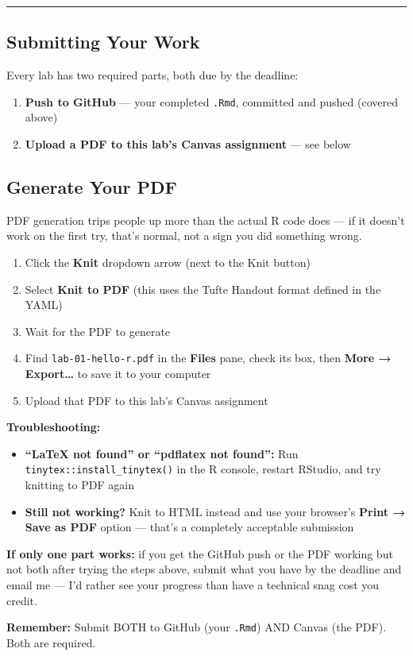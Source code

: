 \documentclass[]{tufte-handout}
\providecommand{\tightlist}{%
  \setlength{\itemsep}{0pt}\setlength{\parskip}{0pt}}
\begin{document}
\begin{center}\rule{0.5\linewidth}{0.5pt}\end{center}

\subsection{Submitting Your Work}\label{submitting-your-work}

Every lab has two required parts, both due by the deadline:

\begin{enumerate}
\def\labelenumi{\arabic{enumi}.}
\tightlist
\item
  \textbf{Push to GitHub} --- your completed \texttt{.Rmd}, committed
  and pushed (covered above)
\item
  \textbf{Upload a PDF to this lab's Canvas assignment} --- see below
\end{enumerate}

\subsection{Generate Your PDF}\label{generate-your-pdf}

PDF generation trips people up more than the actual R code does --- if
it doesn't work on the first try, that's normal, not a sign you did
something wrong.

\begin{enumerate}
\def\labelenumi{\arabic{enumi}.}
\tightlist
\item
  Click the \textbf{Knit} dropdown arrow (next to the Knit button)
\item
  Select \textbf{Knit to PDF} (this uses the Tufte Handout format
  defined in the YAML)
\item
  Wait for the PDF to generate
\item
  Find \texttt{lab-01-hello-r.pdf} in the \textbf{Files} pane, check its
  box, then \textbf{More → Export\ldots{}} to save it to your computer
\item
  Upload that PDF to this lab's Canvas assignment
\end{enumerate}

\textbf{Troubleshooting:}

\begin{itemize}
\tightlist
\item
  \textbf{``LaTeX not found'' or ``pdflatex not found'':} Run
  \texttt{tinytex::install\_tinytex()} in the R console, restart
  RStudio, and try knitting to PDF again
\item
  \textbf{Still not working?} Knit to HTML instead and use your
  browser's \textbf{Print → Save as PDF} option --- that's a completely
  acceptable submission
\end{itemize}

\textbf{If only one part works:} if you get the GitHub push or the PDF
working but not both after trying the steps above, submit what you have
by the deadline and email me --- I'd rather see your progress than have
a technical snag cost you credit.

\textbf{Remember:} Submit BOTH to GitHub (your \texttt{.Rmd}) AND Canvas
(the PDF). Both are required.
\end{document}
